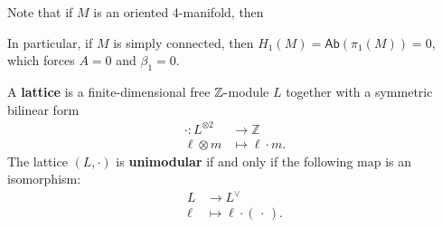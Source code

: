 \begin{remark}

Note that if \(M\) is an oriented 4-manifold, then

\begin{center}
\end{center}

In particular, if \(M\) is simply connected, then
\(H_1(M) = {\mathsf{Ab}}(\pi_1(M)) = 0\), which forces \(A = 0\) and
\(\beta_1 = 0\).

\end{remark}

\begin{definition}[Lattice]

A \textbf{lattice} is a finite-dimensional free
\({\mathbb{Z}}{\hbox{-}}\)module \(L\) together with a symmetric
bilinear form
\begin{align*}
\cdot: L^{\otimes 2} &\to {\mathbb{Z}}\\
\ell \otimes m &\mapsto \ell \cdot m
.\end{align*}
The lattice \((L, \cdot)\) is \textbf{unimodular} if and only if the
following map is an isomorphism:
\begin{align*}
L &\to L^\vee\\
\ell &\mapsto \ell \cdot ({\,\cdot\,})
.\end{align*}

\end{definition}

